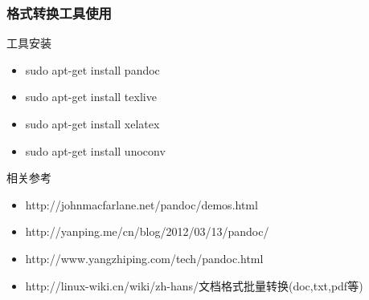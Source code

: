 \begin{frame}\frametitle{格式转换工具使用}

\begin{block}{工具安装}

\begin{itemize}
\item
  sudo apt-get install pandoc
\item
  sudo apt-get install texlive
\item
  sudo apt-get install xelatex
\item
  sudo apt-get install unoconv
\end{itemize}
\end{block}

\begin{block}{相关参考}

\begin{itemize}
\item
  http://johnmacfarlane.net/pandoc/demos.html
\item
  http://yanping.me/cn/blog/2012/03/13/pandoc/
\item
  http://www.yangzhiping.com/tech/pandoc.html
\item
  http://linux-wiki.cn/wiki/zh-hans/文档格式批量转换(doc,txt,pdf等)
\end{itemize}
\end{block}

\end{frame}

